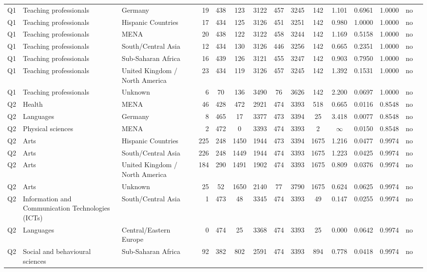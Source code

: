 \begin{longtable}{lllrcccccccccll}
Q1 & Teaching professionals & Germany & 19 & 438 & 123 & 3122 & 457 & 3245 & 142 & 1.101 & 0.6961 & 1.0000 & no \\
Q1 & Teaching professionals & Hispanic Countries & 17 & 434 & 125 & 3126 & 451 & 3251 & 142 & 0.980 & 1.0000 & 1.0000 & no \\
Q1 & Teaching professionals & MENA & 20 & 438 & 122 & 3122 & 458 & 3244 & 142 & 1.169 & 0.5158 & 1.0000 & no \\
Q1 & Teaching professionals & South/Central Asia & 12 & 434 & 130 & 3126 & 446 & 3256 & 142 & 0.665 & 0.2351 & 1.0000 & no \\
Q1 & Teaching professionals & Sub-Saharan Africa & 16 & 439 & 126 & 3121 & 455 & 3247 & 142 & 0.903 & 0.7950 & 1.0000 & no \\
Q1 & Teaching professionals & United Kingdom / North America & 23 & 434 & 119 & 3126 & 457 & 3245 & 142 & 1.392 & 0.1531 & 1.0000 & no \\
Q1 & Teaching professionals & Unknown & 6 & 70 & 136 & 3490 & 76 & 3626 & 142 & 2.200 & 0.0697 & 1.0000 & no \\
Q2 & Health & MENA & 46 & 428 & 472 & 2921 & 474 & 3393 & 518 & 0.665 & 0.0116 & 0.8548 & no \\
Q2 & Languages & Germany & 8 & 465 & 17 & 3377 & 473 & 3394 & 25 & 3.418 & 0.0077 & 0.8548 & no \\
Q2 & Physical sciences & MENA & 2 & 472 & 0 & 3393 & 474 & 3393 & 2 & $\infty$ & 0.0150 & 0.8548 & no \\
Q2 & Arts & Hispanic Countries & 225 & 248 & 1450 & 1944 & 473 & 3394 & 1675 & 1.216 & 0.0477 & 0.9974 & no \\
Q2 & Arts & South/Central Asia & 226 & 248 & 1449 & 1944 & 474 & 3393 & 1675 & 1.223 & 0.0425 & 0.9974 & no \\
Q2 & Arts & United Kingdom / North America & 184 & 290 & 1491 & 1902 & 474 & 3393 & 1675 & 0.809 & 0.0376 & 0.9974 & no \\
Q2 & Arts & Unknown & 25 & 52 & 1650 & 2140 & 77 & 3790 & 1675 & 0.624 & 0.0625 & 0.9974 & no \\
Q2 & Information and Communication Technologies (ICTs) & South/Central Asia & 1 & 473 & 48 & 3345 & 474 & 3393 & 49 & 0.147 & 0.0255 & 0.9974 & no \\
Q2 & Languages & Central/Eastern Europe & 0 & 474 & 25 & 3368 & 474 & 3393 & 25 & 0.000 & 0.0642 & 0.9974 & no \\
Q2 & Social and behavioural sciences & Sub-Saharan Africa & 92 & 382 & 802 & 2591 & 474 & 3393 & 894 & 0.778 & 0.0418 & 0.9974 & no \\

\end{longtable}
